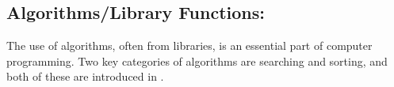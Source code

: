 \begin{comment}

\paragraph{\Scanns:}
The \Scan card represents the action of a user explicitly scanning all of their files to find any infected items using an antivirus tool. If the player is under the influence of either a malware or a hack card, then the \Scan card allows the players to choose a single effect to remove. If the player is not under the influence of a cyberattack card, the effect is saved until the player is attacked, at which time the cyberattack is neutralized and the \Scan effect is removed. 

\paragraph{\Antins:}
An antivirus program is a program or set of programs designed to prevent, search for, detect, and remove malware from a computer system. The \Anti card reflects this real-world tool by protecting a player from the effect of any of the malware attack cards. If the player is already under the effect of one or more malware cards, all of the effects are removed when this card is played. Unlike the \Scan card, the effect of this card is permanent once it is played, thereby protecting the player from any future malware card attacks. 

\paragraph{\Firens:}
A firewall is a network security device that controls incoming and outgoing network traffic and grants or prevents data packets based on a set of security rules, thereby protecting a computer system from various intrusion attacks. Like the \Anti card, the \Fire card reflects this real-world tool by preventing hack cards from being played on the player. Similar to the \Anti card, if the player is affected by any hack cards, these effects are removed. The effect of this card is also permanent once played.

\end{comment}

\subsection{Algorithms/Library Functions:}
The use of algorithms, often from libraries, is an essential part of computer programming. Two key categories of algorithms are searching and sorting, and both of these are introduced in \pwThree.


